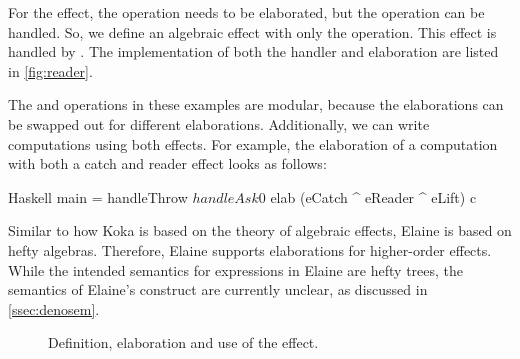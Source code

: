 For the  effect, the  operation needs to be elaborated, but the  operation can be handled. So, we define an algebraic effect  with only the  operation. This effect is handled by . The implementation of both the handler and elaboration are listed in \cref{fig:reader}.

The  and  operations in these examples are modular, because the elaborations can be swapped out for different elaborations. Additionally, we can write computations using both effects. For example, the elaboration of a computation with both a catch and reader effect looks as follows:

\begin{lst}{Haskell}
main = handleThrow $ handleAsk 0 $
  elab (eCatch ^ eReader ^ eLift) c
\end{lst}
%
Similar to how Koka is based on the theory of algebraic effects, Elaine is based on hefty algebras. Therefore, Elaine supports elaborations for higher-order effects. While the intended semantics for expressions in Elaine are hefty trees, the semantics of Elaine's  construct are currently unclear, as discussed in \cref{ssec:denosem}.

\begin{figure}[p]
\caption{Definition, elaboration and use of the  effect.}
\label{fig:except}
\end{figure}

